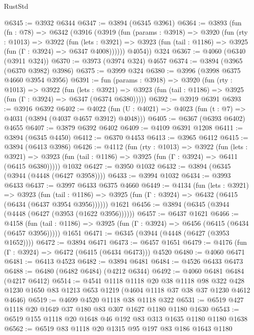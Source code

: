 \begin{lexlean}{RustStd}
\begin{coremodule}
{\begin{coremodule}
{{{{{{{{{{{{{{{{{{{{{{{{{{{{{{{{@6345 := @3932 @6344
@6347 := @3894 (@6345 @3961)
@6364 := @3893
    (fun (fn : @78) =>
    @6342
      (@3916
        (@3919
          (fun (params : @3918) =>
          @3920
            (fun (rty : @1013) =>
            @3922
              (fun (lets : @3921) =>
              @3923 (fun (tail : @1186) => @3925 (fun (Γ : @3924) => @6347 @4008))))))
        @4054))
    @324
@6367 := @4060 (@6340 (@3911 @324))
@6370 := @3973 (@3974 @324) @4657
@6374 := @3894 (@3965 (@6370 @3982) @3986)
@6375 := @3999 @324
@6380 := @3996 (@3998 @6375 @4660 @3954 @3956)
@6391 := fun (params : @3918) =>
  @3920
    (fun (rty : @1013) =>
    @3922
      (fun (lets : @3921) =>
      @3923 (fun (tail : @1186) => @3925 (fun (Γ : @3924) => @6347 (@6374 @6380)))))
@6392 := @3919 @6391
@6393 := @3916 @6392
@6402 := @4022 (fun (U : @4021) => @4023 (fun (t : @7) => @4031 (@3894 (@4037 @4657 @3912) @4048)))
@6405 := @6367 (@6393 @6402) @4655
@6407 := @3879 @6392 @6402
@6409 := @4109 @6391 @1208
@6411 := @3894 (@6345 @4450)
@6412 := @6370 @4453
@6413 := @3965 @6412
@6415 := @3894 (@6413 @3986)
@6426 := @4112
    (fun (rty : @1013) =>
    @3922
      (fun (lets : @3921) =>
      @3923 (fun (tail : @1186) => @3925 (fun (Γ : @3924) => @6411 (@6415 @6380)))))
    @1032
@6427 := @3950 @1032
@6432 := @3894 (@6345 (@3944 (@4448 (@6427 @3958))))
@6433 := @3994 @1032
@6434 := @3993 @6433
@6437 := @3997 @6433 @6375 @4660
@6449 := @4134
    (fun (lets : @3921) =>
    @3923
      (fun (tail : @1186) => @3925 (fun (Γ : @3924) => @6432 (@6415 (@6434 (@6437 @3954 @3956))))))
    @1621
@6456 := @3894 (@6345 (@3944 (@4448 (@6427 (@3953 (@1622 @3956))))))
@6457 := @6437 @1621
@6466 := @4158
    (fun (tail : @1186) => @3925 (fun (Γ : @3924) => @6456 (@6415 (@6434 (@6457 @3956)))))
    @1651
@6471 := @6345 (@3944 (@4448 (@6427 (@3953 @1652))))
@6472 := @3894 @6471
@6473 := @6457 @1651
@6479 := @4176 (fun (Γ : @3924) => @6472 (@6415 (@6434 @6473))) @4520
@6480 := @4060 @6471
@6481 := @6413 @4523
@6482 := @3894 @6481
@6484 := @4526 @6433 @6473
@6488 := @6480 (@6482 @6484) (@4212 @6344)
@6492 := @4060 @6481 @6484 (@4217 @6412)
@6514 := @4541
    @1118
    @1118
    @20
    @38
    @1118
    @98
    @322
    @428
    @1230
    @1650
    @83
    @1213
    @653
    @1219
    (@4604 @1118 @37 @38 @37 @1230 @4612 @4646)
@6519 := @4699 @4520 @1118 @38 @1118 @322
@6531 := @6519 @427 @1118 @20 @1649 @37 @180 @83 @307 @1627 @1180 @1180 @1630
@6543 := @6519 @155 @1118 @20 @1648 @46 @192 @83 @313 @1635 @1180 @1180 @1638
@6562 := @6519
    @83
    @1118
    @20
    @1315
    @95
    @197
    @83
    @186
    @1643
    @1180
}}}}}}}}}}}}}}}}}}}}}}}}}}}}}}}}
\end{coremodule}}
\end{coremodule}
\end{lexlean}
